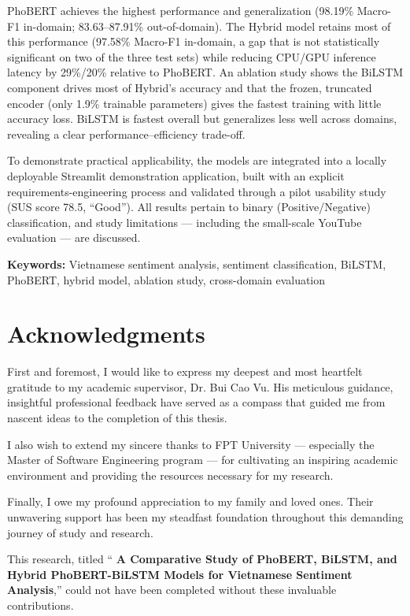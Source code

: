 \documentclass[12pt]{report} %
\newcommand{\thesistitle}{	
\textbf{A Comparative Study of PhoBERT, BiLSTM, and Hybrid PhoBERT-BiLSTM Models for Vietnamese Sentiment Analysis}}
\newcommand{\supervisor}{Dr. Bui Cao Vu}
\begin{document}
PhoBERT achieves the highest performance and generalization (98.19\% Macro-F1 in-domain; 83.63--87.91\% out-of-domain). The Hybrid model retains most of this performance (97.58\% Macro-F1 in-domain, a gap that is not statistically significant on two of the three test sets) while reducing CPU/GPU inference latency by 29\%/20\% relative to PhoBERT. An ablation study shows the BiLSTM component drives most of Hybrid's accuracy and that the frozen, truncated encoder (only 1.9\% trainable parameters) gives the fastest training with little accuracy loss. BiLSTM is fastest overall but generalizes less well across domains, revealing a clear performance–efficiency trade-off.

To demonstrate practical applicability, the models are integrated into a locally deployable Streamlit demonstration application, built with an explicit requirements-engineering process and validated through a pilot usability study (SUS score 78.5, ``Good''). All results pertain to binary (Positive/Negative) classification, and study limitations --- including the small-scale YouTube evaluation --- are discussed.

\noindent\textbf{Keywords:} Vietnamese sentiment analysis, sentiment classification, BiLSTM, PhoBERT, hybrid model, ablation study, cross-domain evaluation
\chapter*{Acknowledgments}

First and foremost, I would like to express my deepest and most heartfelt gratitude to my academic supervisor, \supervisor. His meticulous guidance, insightful professional feedback have served as a compass that guided me from nascent ideas to the completion of this thesis.

I also wish to extend my sincere thanks to FPT University --- especially the Master of Software Engineering program --- for cultivating an inspiring academic environment and providing the resources necessary for my research.

Finally, I owe my profound appreciation to my family and loved ones. Their unwavering support has been my steadfast foundation throughout this demanding journey of study and research.

This research, titled ``\thesistitle,'' could not have been completed without these invaluable contributions.

\tableofcontents
\end{document}
